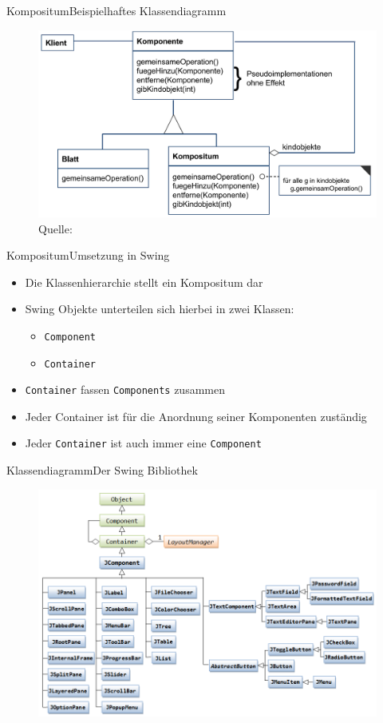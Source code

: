 \begin{frame}{Kompositum}{Beispielhaftes Klassendiagramm}
    \begin{figure}
	\includegraphics*[width=.8\textwidth]{graph/compositum_cd}
    \caption*{Quelle: \cite{judt2017}}
    \end{figure}
\end{frame}

\begin{frame}{Kompositum}{Umsetzung in Swing}
	\begin{itemize}
		\item Die Klassenhierarchie stellt ein Kompositum dar
		\item Swing Objekte unterteilen sich hierbei in zwei Klassen:
		\begin{itemize}
			\item \texttt{Component}
			\item \texttt{Container}
		\end{itemize}
		\item \texttt{Container} fassen \texttt{Components} zusammen
		\item Jeder Container ist für die Anordnung seiner Komponenten zuständig
		\item Jeder \texttt{Container} ist auch immer eine \texttt{Component}
	\end{itemize}
\end{frame}

\begin{frame}{Klassendiagramm}{Der Swing Bibliothek}
    \begin{figure}
	\includegraphics*[width=.8\textwidth]{graph/swing_cd}
    \end{figure}
\end{frame}

